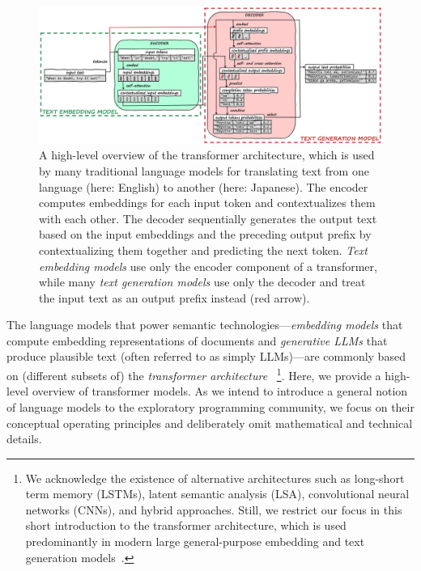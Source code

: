 \begin{figure}[Z]
	\centering
	\includegraphics[width=\linewidth]{04_semtec/transformer.png}
	\caption[A high-level overview of the \emph{transformer architecture} for large language models that embed and generate text.]{
		A high-level overview of the transformer architecture, which is used by many traditional language models for translating text from one language (here: English) to another (here: Japanese).
		The encoder computes embeddings for each input token and contextualizes them with each other.
		The decoder sequentially generates the output text based on the input embeddings and the preceding output prefix by contextualizing them together and predicting the next token.
		\emph{Text embedding models} use only the encoder component of a transformer, while many \emph{text generation models} use only the decoder and treat the input text as an output prefix instead (\textcolor[HTML]{c00000}{red} arrow).
	}
	\label{fig:background/semtec/transformer}
\end{figure}

The language models that power semantic technologies---\emph{embedding models} that compute embedding representations of documents and \emph{generative LLMs} that produce plausible text (often referred to as simply LLMs)---are commonly based on (different subsets of) the \emph{transformer architecture}~\cite{vaswani2017attention}%
\footnote{
	We acknowledge the existence of alternative architectures such as long-short term memory (LSTMs), latent semantic analysis (LSA), convolutional neural networks (CNNs), and hybrid approaches.
	Still, we restrict our focus in this short introduction to the transformer architecture, which is used predominantly in modern large general-purpose embedding and text generation models~\cite{oralkbekova2023contemporary}.
}.
Here, we provide a high-level overview of transformer models.
As we intend to introduce a general notion of language models to the exploratory programming community, we focus on their conceptual operating principles and deliberately omit mathematical and technical details.

